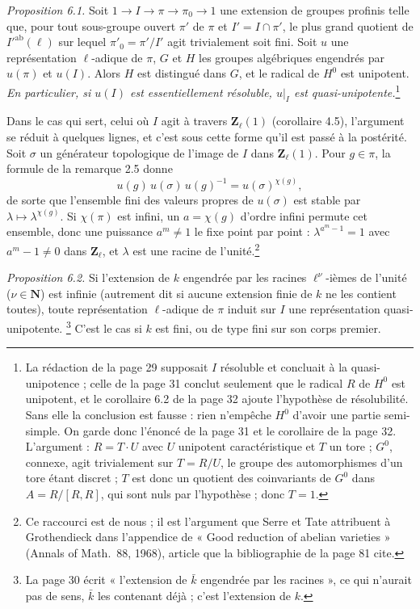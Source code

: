 \documentclass[11pt,a4paper]{article}
\begin{document}
\emph{Proposition 6.1.} Soit $1 \to I \to \pi \to \pi_0 \to 1$ une extension
de groupes profinis telle que, pour tout sous-groupe ouvert $\pi'$ de $\pi$ et
$I' = I \cap \pi'$, le plus grand quotient de $I'^{\mathrm{ab}}(\ell)$ sur lequel
$\pi'_0 = \pi'/I'$ agit trivialement soit fini. Soit $u$ une représentation
$\ell$-adique de $\pi$, $G$ et $H$ les groupes algébriques engendrés par $u(\pi)$
et $u(I)$. Alors $H$ est distingué dans $G$, et le radical de $H^0$ est
unipotent. \emph{En particulier, si $u(I)$ est essentiellement résoluble, $u|_I$
est quasi-unipotente.}\footnote{La rédaction de la page 29 supposait $I$
résoluble et concluait à la quasi-unipotence ; celle de la page 31 conclut
seulement que le radical $R$ de $H^0$ est unipotent, et le corollaire 6.2 de la
page 32 ajoute l'hypothèse de résolubilité. Sans elle la conclusion est fausse :
rien n'empêche $H^0$ d'avoir une partie semi-simple. On garde donc l'énoncé de
la page 31 et le corollaire de la page 32. L'argument : $R = T \cdot U$ avec
$U$ unipotent caractéristique et $T$ un tore ; $G^0$, connexe, agit
trivialement sur $T = R/U$, le groupe des automorphismes d'un tore étant
discret ; $T$ est donc un quotient des coinvariants de $G^0$ dans
$A = R/[R,R]$, qui sont nuls par l'hypothèse ; donc $T = 1$.}

Dans le cas qui sert, celui où $I$ agit à travers $\mathbf{Z}_\ell(1)$
(corollaire 4.5), l'argument se réduit à quelques lignes, et c'est sous cette
forme qu'il est passé à la postérité. Soit $\sigma$ un générateur
topologique de l'image de $I$ dans $\mathbf{Z}_\ell(1)$. Pour $g \in \pi$, la
formule de la remarque 2.5 donne
\[
  u(g)\,u(\sigma)\,u(g)^{-1} = u(\sigma)^{\chi(g)} ,
\]
de sorte que l'ensemble fini des valeurs propres de $u(\sigma)$ est stable par
$\lambda \mapsto \lambda^{\chi(g)}$. Si $\chi(\pi)$ est infini, un $a = \chi(g)$
d'ordre infini permute cet ensemble, donc une puissance $a^m \neq 1$ le fixe
point par point : $\lambda^{a^m - 1} = 1$ avec $a^m - 1 \neq 0$ dans
$\mathbf{Z}_\ell$, et $\lambda$ est une racine de l'unité.\footnote{Ce
raccourci est de nous ; il est l'argument que Serre et Tate attribuent à
Grothendieck dans l'appendice de « Good reduction of abelian varieties »
(Annals of Math.\ 88, 1968), article que la bibliographie de la page 81 cite.}

\emph{Proposition 6.2.} Si l'extension de $k$ engendrée par les racines
$\ell^\nu$-ièmes de l'unité ($\nu \in \mathbf{N}$) est infinie (autrement dit
si aucune extension finie de $k$ ne les contient toutes), toute représentation
$\ell$-adique de $\pi$ induit sur $I$ une représentation quasi-unipotente.
\footnote{La page 30 écrit « l'extension de $\bar k$ engendrée par les racines »,
ce qui n'aurait pas de sens, $\bar k$ les contenant déjà ; c'est l'extension de
$k$.} C'est le cas si $k$ est fini, ou de type fini sur son corps premier.
\end{document}
